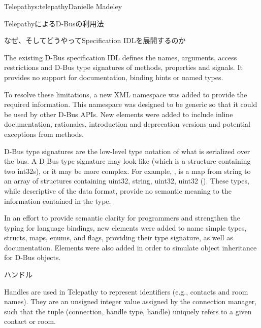 \begin{aosachapter}{Telepathy}{s:telepathy}{Danielle Madeley}
\begin{aosasect1}{TelepathyによるD-Busの利用法}
\begin{aosabox}{なぜ、そしてどうやってSpecification IDLを展開するのか}

The existing D-Bus specification IDL defines the names, arguments,
access restrictions and D-Bus type signatures of methods, properties
and signals. It provides no support for documentation, binding hints
or named types.

To resolve these limitations, a new XML namespace was added to provide
the required information. This namespace was designed to be generic so
that it could be used by other D-Bus APIs. New elements were added to
include inline documentation, rationales, introduction and deprecation
versions and potential exceptions from methods.

D-Bus type signatures are the low-level type notation of what is
serialized over the bus. A D-Bus type signature may look like
 (which is a structure containing two int32s), or it may be
more complex.  For example, , is a map from string
to an array of structures containing uint32, string, uint32, uint32
().  These types, while
descriptive of the data format, provide no semantic meaning to the
information contained in the type.

In an effort to provide semantic clarity for programmers and
strengthen the typing for language bindings, new elements were added
to name simple types, structs, maps, enums, and flags, providing their
type signature, as well as documentation.  Elements were also added in
order to simulate object inheritance for D-Bus objects.

\end{aosabox}


\begin{aosasect2}{ハンドル}

Handles are used in Telepathy to represent identifiers (e.g., contacts
and room names). They are an unsigned integer value assigned by the
connection manager, such that the tuple (connection, handle type,
handle) uniquely refers to a given contact or room.


\end{aosasect2}
\end{aosasect1}
\end{aosachapter}
